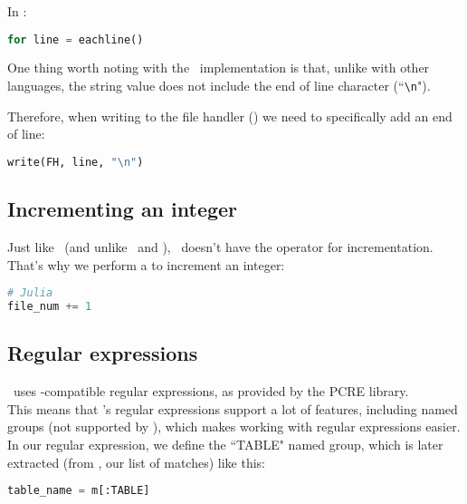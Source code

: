 In \julia:
\begin{lstlisting}[language=python]
for line = eachline()
\end{lstlisting}

\bigskip

 One thing worth noting with the \julia\ implementation is that, unlike with other languages, the string value does not include the end of line character (``\lstinline|\n|").

Therefore, when writing to the file handler () we need to specifically add an end of line:
\begin{lstlisting}[language=python]
write(FH, line, "\n")
\end{lstlisting}




\subsection*{Incrementing an integer}

Just like \python\ (and unlike \awk\ and \perl), \julia\ doesn't have the \cmd{++} operator for incrementation. \\

That's why we perform a  to increment an integer:

\begin{lstlisting}[language=python]
# Julia
file_num += 1
\end{lstlisting}



\subsection*{Regular expressions}

\julia\ uses \perl-compatible regular expressions, as provided by the PCRE library. \\

This means that \julia's regular expressions support a lot of features, including named groups (not supported by \awk), which makes working with regular expressions easier. \\

In our regular expression, we define the ``TABLE" named group, which is later extracted (from , our list of matches) like this:

\begin{lstlisting}[language=python]
table_name = m[:TABLE]
\end{lstlisting}




